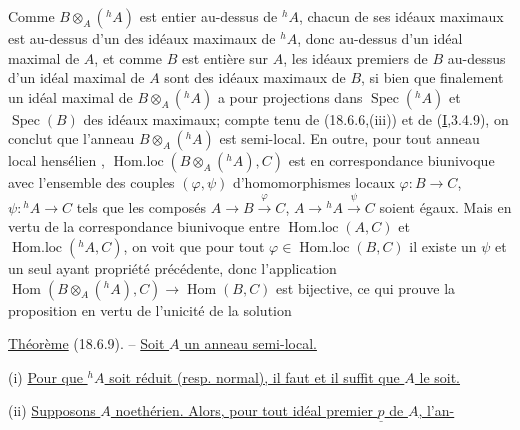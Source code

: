  Comme $B\otimes_A({}^h A)$ est entier au-dessus de ${}^h A$, chacun de ses idéaux maximaux est au-dessus d'un des idéaux maximaux de ${}^h A$, donc au-dessus d'un idéal maximal de $A$, et comme $B$ est entière sur $A$, les idéaux premiers de $B$ au-dessus d'un idéal maximal de $A$ sont des idéaux maximaux de $B$, si bien que finalement un idéal maximal de $B\otimes_A({}^h A)$ a pour projections dans $\operatorname{Spec}({}^h A)$ et $\operatorname{Spec}(B)$ des idéaux maximaux; compte tenu de (18.6.6,(iii)) et de (\uline{I},3.4.9), on conclut que l'anneau $B\otimes_A({}^h A)$ est semi-local. En outre, pour tout anneau local hensélien , $\operatorname{Hom.loc}(B\otimes_A({}^h A),C)$ est en correspondance biunivoque avec l'ensemble des couples $(\varphi,\psi)$ d'homomorphismes locaux $\varphi:B\to C$, $\psi:{}^h A\to C$ tels que les composés $A\to B\xrightarrow{\varphi}C$, $A\to{}^h A\xrightarrow{\psi}C$ soient égaux. Mais  en vertu de la correspondance biunivoque entre $\operatorname{Hom.loc}(A,C)$ et $\operatorname{Hom.loc}({}^h A,C)$, on voit que pour tout $\varphi\in\operatorname{Hom.loc}(B,C)$ il existe un $\psi$ et un seul ayant  propriété précédente, donc l'application $\operatorname{Hom}(B\otimes_A({}^h A),C)\to\operatorname{Hom}(B,C)$ est bijective, ce qui prouve la proposition en vertu de l'unicité de la solution


\uline{Théorème} (18.6.9). -- \uline{Soit $A$ un anneau semi-local.}

(i) \uline{Pour que ${}^h A$ soit réduit (resp. normal), il faut et il suffit que $A$ le soit.}

(ii) \uline{Supposons $A$ noethérien. Alors, pour tout idéal premier $\underline p$ de $A$, l'an-}
